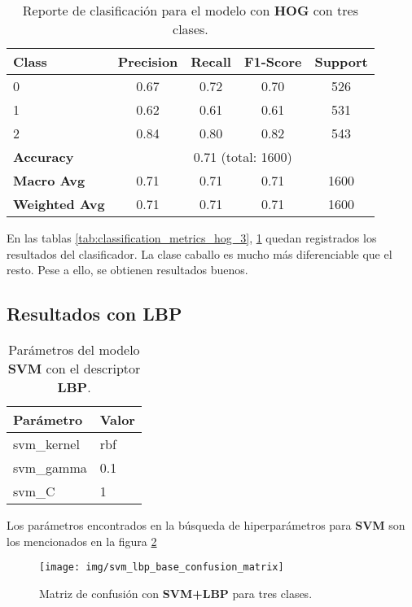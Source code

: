 \documentclass[12pt,letterpaper]{article}
\begin{document}
\begin{table}[htp]
    \centering
    \begin{tabular}{lcccc}
    \hline
    \textbf{Class} & \textbf{Precision} & \textbf{Recall} & \textbf{F1-Score} & \textbf{Support} \\
    \hline
    0 & 0.67 & 0.72 & 0.70 & 526 \\
    1 & 0.62 & 0.61 & 0.61 & 531 \\
    2 & 0.84 & 0.80 & 0.82 & 543 \\
    \hline
    \textbf{Accuracy} & \multicolumn{4}{c}{0.71 (total: 1600)} \\
    \textbf{Macro Avg} & 0.71 & 0.71 & 0.71 & 1600 \\
    \textbf{Weighted Avg} & 0.71 & 0.71 & 0.71 & 1600 \\
    \hline
    \end{tabular}
    \caption{Reporte de clasificación para el modelo con \textbf{HOG} con tres clases.}
    \label{tab:classification_report_hog_3}
\end{table}

En las tablas \ref{tab:classification_metrics_hog_3}, \ref{tab:classification_report_hog_3} quedan registrados los resultados del clasificador. La clase caballo es mucho más diferenciable que el resto. Pese a ello, se obtienen resultados buenos.

\subsection{Resultados con LBP}
\begin{table}[htp]
    \centering
    \begin{tabular}{ll}
    \hline
    \textbf{Parámetro} & \textbf{Valor} \\
    \hline
    svm\_kernel & rbf \\
    svm\_gamma & 0.1 \\
    svm\_C & 1 \\
    \hline
    \end{tabular}
    \caption{Parámetros del modelo \textbf{SVM} con el descriptor \textbf{LBP}.}
    \label{tab:svm_params4}
\end{table}

Los parámetros encontrados en la búsqueda de hiperparámetros para \textbf{SVM} son los mencionados en la figura \ref{tab:svm_params4}

\begin{figure}[htp]
    \centering
    \texttt{[image: img/svm\_lbp\_base\_confusion\_matrix]}
    \caption{Matriz de confusión con \textbf{SVM+LBP} para tres clases.}
    \label{fig:confusion_matrix_3}
\end{figure}
\end{document}
